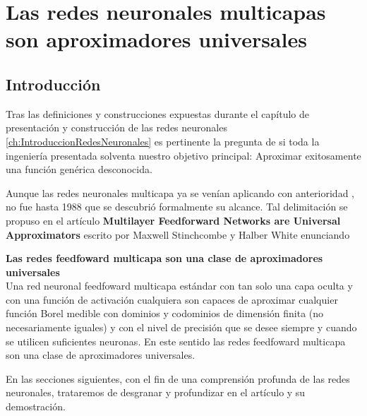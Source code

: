 %

\chapter{Las redes neuronales multicapas son aproximadores universales}  

\section{Introducción}  

Tras las definiciones y construcciones expuestas durante el capítulo de presentación y construcción de las redes neuronales \ref{ch:IntroduccionRedesNeuronales} 
es pertinente la pregunta de si toda la ingeniería presentada solventa nuestro objetivo principal: Aproximar exitosamente una función genérica desconocida.   

Aunque las redes neuronales multicapa ya se venían aplicando con anterioridad \cite{4307059}, 
no fue hasta 1988 que se descubrió formalmente su alcance. Tal delimitación se propuso en el artículo \cite{HORNIK1989359}
\textbf{Multilayer Feedforward Networks are Universal Approximators} escrito por Maxwell Stinchcombe y Halber White enunciando 

\begin{teorema}\textbf{Las redes feedfoward multicapa son una clase de aproximadores universales } \label{teo:MFNAUA}
    \\
    Una red neuronal feedfoward multicapa estándar con tan solo una capa oculta y con una función de activación cualquiera son capaces de aproximar cualquier 
    función Borel medible  con dominios y codominios de dimensión finita (no necesariamente iguales) y con el nivel de precisión que se desee siempre y cuando 
    se utilicen suficientes neuronas. En este sentido las redes feedfoward multicapa son una clase de aproximadores universales.

\end{teorema}

En las secciones siguientes, con el fin de una comprensión profunda de las redes neuronales, trataremos de desgranar y profundizar en el artículo y su demostración. 


